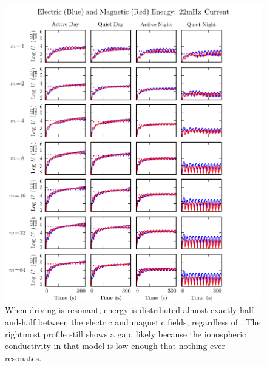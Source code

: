 \begin{figure}[H]
    \centering
    \includegraphics[width=\textwidth]{figures/U_BE_022mHz.pdf}
    \caption[Current-Driven Electric and Magnetic Energy: 22mHz]{
      When driving is resonant, energy is distributed almost exactly half-and-half between the electric and magnetic fields, regardless of \azm. The rightmost profile still shows a gap, likely because the ionospheric conductivity in that model is low enough that nothing ever resonates. 
    }
    \label{fig_U_BE_022mHz}
\end{figure}













